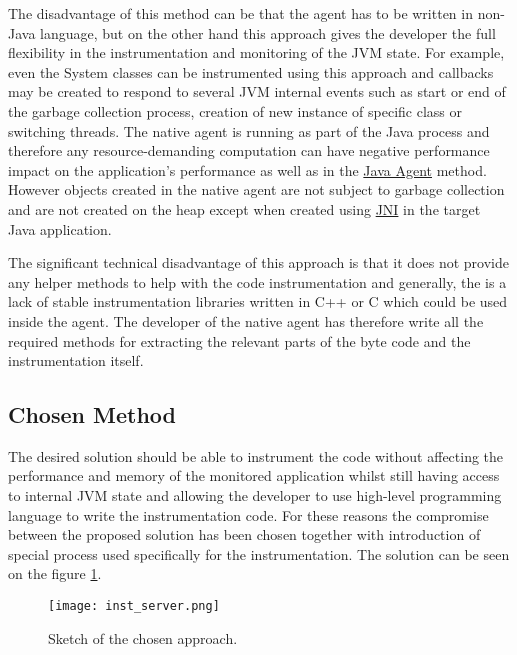 The disadvantage of this method can be that the agent has to be written in non-Java language, but on the other hand this approach gives the developer the full flexibility in the instrumentation and monitoring of the JVM state. For example, even the System classes can be instrumented using this approach and callbacks may be created to respond to several JVM internal events such as start or end of the garbage collection process, creation of new instance of specific class or switching threads. The native agent is running as part of the Java process and therefore any resource-demanding computation can have negative performance impact on the application's performance as well as in the \hyperref[java_agent]{Java Agent} method. However objects created in the native agent are not subject to garbage collection and are not created on the heap except when created using \hyperref[JNI]{JNI} in the target Java application.

The significant technical disadvantage of this approach is that it does not provide any helper methods to help with the code instrumentation and generally, the is a lack of stable instrumentation libraries written in C++ or C which could be used inside the agent. The developer of the native agent has therefore write all the required methods for extracting the relevant parts of the byte code and the instrumentation itself.
\subsection{Chosen Method}
\label{subsec:inst_jvm}
The desired solution should be able to instrument the code without affecting the performance and memory of the monitored application whilst still having access to internal JVM state and allowing the developer to use high-level programming language to write the instrumentation code. For these reasons the compromise between the proposed solution has been chosen together with introduction of special process used specifically for the instrumentation. The solution can be seen on the figure \ref{fig:inst_server_basic}.
\begin{figure}
	\centering
	\texttt{[image: inst\_server.png]}
	\caption{Sketch of the chosen approach.}
	\label{fig:inst_server_basic}
\end{figure}

